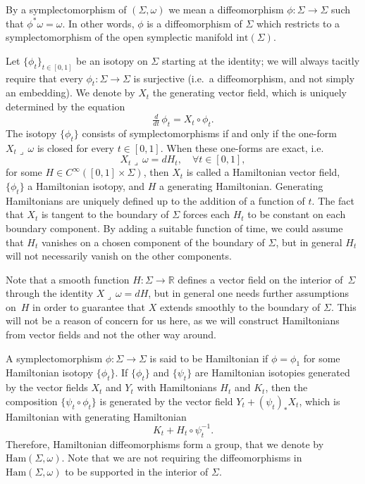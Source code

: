 \documentclass[10pt,a4paper]{amsart}
\providecommand{\ie}{i.e.\ }
\let\mathds\mathbb
\theoremstyle{definition}
\newcommand{\Ham}{\mathrm{Ham}}
\newcommand{\R}{\mathds{R}}
\providecommand{\ie}{i.e. }
\begin{document}
By a symplectomorphism of $(\Sigma,\omega)$ we mean a diffeomorphism $\phi: \Sigma \to \Sigma$ such that $\phi^* \omega = \omega$. In other words, $\phi$ is a diffeomorphism of $\Sigma$ which restricts to a symplectomorphism of the open symplectic manifold $\mathrm{int}(\Sigma)$.

Let $\{\phi_t\}_{t\in [0,1]}$ be an isotopy on $\Sigma$ starting at the identity; we will always tacitly require that every $\phi_t:\Sigma\to\Sigma$ is surjective (\ie a diffeomorphism, and not simply an embedding). We denote by $X_t$ the generating vector field, which is uniquely determined by the equation
\[
\tfrac{d}{dt}\, \phi_t = X_t\circ\phi_t.
\]
The isotopy $\{\phi_t\}$ consists of symplectomorphisms if and only if the one-form $X_t \lrcorner \,\omega$ is closed for every $t\in [0,1]$. When these one-forms are exact, \ie
\[
X_t \lrcorner \,\omega = dH_t, \quad \forall t\in [0,1],
\]
for some $H\in C^{\infty}([0,1]\times \Sigma)$, then $X_t$ is called a Hamiltonian vector field, $\{\phi_t\}$ a Hamiltonian isotopy, and $H$ a generating Hamiltonian. Generating Hamiltonians are uniquely defined up to the addition of a function of $t$. The fact that $X_t$ is tangent to the boundary of $\Sigma$ forces each $H_t$ to be constant on each boundary component. By adding a suitable function of time, we could assume that $H_t$ vanishes on a chosen component of the boundary of $\Sigma$, but in general $H_t$ will not necessarily vanish on the other components.

Note that a smooth function $H:\Sigma\to\R$ defines a vector field on the interior of~$\Sigma$ through the identity $X \lrcorner \,\omega = dH$, but in general one needs further assumptions on~$H$ in order to guarantee that $X$ extends smoothly to the boundary of $\Sigma$. This will not be a reason of concern for us here, as we will construct Hamiltonians from vector fields and not the other way around.

A symplectomorphism $\phi: \Sigma \to \Sigma$ is said to be Hamiltonian if $\phi=\phi_1$ for some Hamiltonian isotopy $\{\phi_t\}$. If $\{\phi_t\}$ and $\{\psi_t\}$ are Hamiltonian isotopies generated by the vector fields $X_t$ and $Y_t$ with Hamiltonians $H_t$ and $K_t$, then the composition $\{\psi_t \circ \phi_t\}$ is generated by the vector field $Y_t + (\psi_t)_* X_t$, which is Hamiltonian with generating Hamiltonian
\begin{equation}
\label{hamprod}
K_t + H_t \circ \psi_t^{-1}.
\end{equation}
Therefore, Hamiltonian diffeomorphisms form a group, that we denote by~$\Ham(\Sigma,\omega)$. Note that we are not requiring the diffeomorphisms in $\Ham(\Sigma,\omega)$ to be supported in the interior of $\Sigma$.
\end{document}
